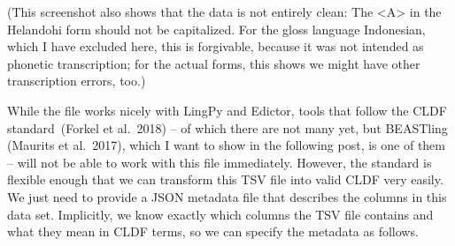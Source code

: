 \documentclass[
  english,
  a4paper,
  oneside,tablecaptionabove
]{scrbook}
\begin{document}
(This screenshot also shows that the data is not entirely clean: The
\textless{}A\textgreater{} in the Helandohi form should not be
capitalized. For the gloss language Indonesian, which I have excluded
here, this is forgivable, because it was not intended as phonetic
transcription; for the actual forms, this shows we might have other
transcription errors, too.)

While the file works nicely with LingPy and Edictor, tools that follow
the CLDF standard~(Forkel et al.~2018) -- of which there are not many
yet, but BEASTling (Maurits et al.~2017), which I want to show in the
following post, is one of them -- will not be able to work with this
file immediately. However, the standard is flexible enough that we can
transform this TSV file into valid CLDF very easily. We just need to
provide a JSON metadata file that describes the columns in this data
set. Implicitly, we know exactly which columns the TSV file contains and
what they mean in CLDF terms, so we can specify the metadata as follows.
\end{document}
